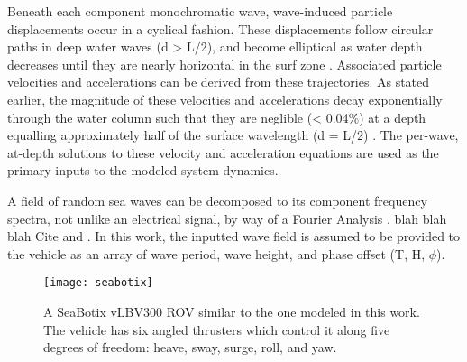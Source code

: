 \documentclass[letterpaper, 10 pt, conferences]{ieeeconf}  %
\begin{document}
Beneath each component monochromatic wave, wave-induced particle displacements occur in a cyclical fashion. These displacements follow circular paths in deep water waves (d > L/2), and become elliptical as water depth decreases until they are nearly horizontal in the surf zone \cite{D&D}. Associated particle velocities and accelerations can be derived from these trajectories. As stated earlier, the magnitude of these velocities and accelerations decay exponentially through the water column such that they are neglible (< 0.04\%) at a depth equalling approximately half of the surface wavelength (d = L/2) \cite{D&D}. The per-wave, at-depth solutions to these velocity and acceleration equations are used as the primary inputs to the modeled system dynamics.

A field of random sea waves can be decomposed to its component frequency spectra, not unlike an electrical signal, by way of a Fourier Analysis \cite{goda}. blah blah blah Cite \cite{falnes} and \cite{ling}. In this work, the inputted wave field is assumed to be provided to the vehicle as an array of wave period, wave height, and phase offset (T, H, $\phi$). 

\begin{figure}
\texttt{[image: seabotix]}
\centering
\caption{A SeaBotix vLBV300 ROV similar to the one modeled in this work. The vehicle has six angled thrusters which control it along five degrees of freedom: heave, sway, surge, roll, and yaw.}
\centering
\label{fig:seabotix}
\end{figure}
\end{document}
